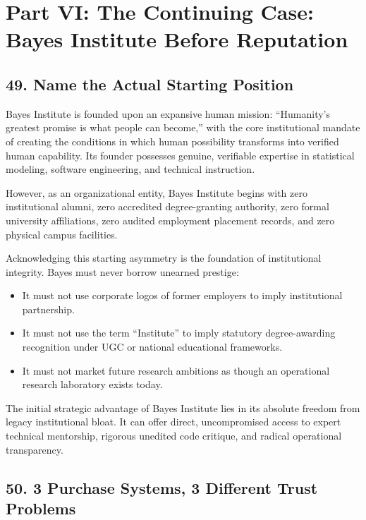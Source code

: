 \section*{Part VI: The Continuing Case: Bayes Institute Before Reputation}

\subsection*{49. Name the Actual Starting Position}

Bayes Institute is founded upon an expansive human mission: ``Humanity's greatest promise is what people can become,'' with the core institutional mandate of creating the conditions in which human possibility transforms into verified human capability. Its founder possesses genuine, verifiable expertise in statistical modeling, software engineering, and technical instruction.

However, as an organizational entity, Bayes Institute begins with zero institutional alumni, zero accredited degree-granting authority, zero formal university affiliations, zero audited employment placement records, and zero physical campus facilities. 

Acknowledging this starting asymmetry is the foundation of institutional integrity. Bayes must never borrow unearned prestige:
\begin{itemize}
\item It must not use corporate logos of former employers to imply institutional partnership.
\item It must not use the term ``Institute'' to imply statutory degree-awarding recognition under UGC or national educational frameworks.
\item It must not market future research ambitions as though an operational research laboratory exists today.
\end{itemize}

The initial strategic advantage of Bayes Institute lies in its absolute freedom from legacy institutional bloat. It can offer direct, uncompromised access to expert technical mentorship, rigorous unedited code critique, and radical operational transparency.

\subsection*{50. 3 Purchase Systems, 3 Different Trust Problems}

